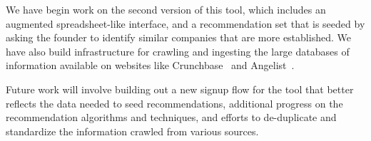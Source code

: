 We have begin work on the second version of this tool, which includes an augmented spreadsheet-like interface, and a recommendation set that is seeded by asking the founder to identify similar companies that are more established. We have also build infrastructure for crawling and ingesting the large databases of information available on websites like Crunchbase~\cite{crunchbase} and Angelist~\cite{angelist}.

Future work will involve building out a new signup flow for the tool that better reflects the data needed to seed recommendations, additional progress on the recommendation algorithms and techniques, and efforts to de-duplicate and standardize the information crawled from various sources.
